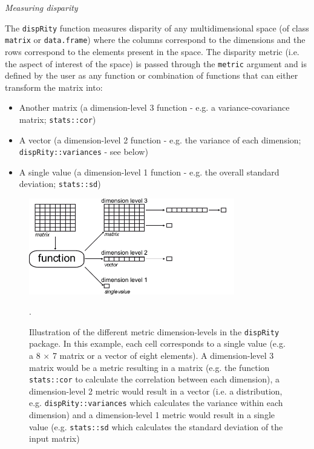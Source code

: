 \documentclass[12pt,letterpaper]{article}
\renewcommand{\subsection}[1]{%
\bigskip
\begin{center}
\begin{large}
\normalfont\itshape #1
\end{large}
\end{center}}
\newcommand{\disp}{\texttt{dispRity} }
\begin{document}
\subsection{Measuring disparity}
The \disp function measures disparity of any multidimensional space (of class \texttt{matrix} or \texttt{data.frame}) where the columns correspond to the dimensions and the rows correspond to the elements present in the space.
The disparity metric (i.e. the aspect of interest of the space) is passed through the \texttt{metric} argument and is defined by the user as any function or combination of functions that can either transform the matrix into:

\begin{itemize}
    \item Another matrix (a dimension-level 3 function - e.g. a variance-covariance matrix; \texttt{stats::cor})
    \item A vector (a dimension-level 2 function - e.g. the variance of each dimension; \texttt{dispRity::variances} - see below)
    \item A single value (a dimension-level 1 function - e.g. the overall standard deviation; \texttt{stats::sd})
\end{itemize}

\begin{figure}[!htbp]
\centering
   \includegraphics[width=0.8\textwidth]{../inst/gitbook/dispRity_fun.pdf} 
\caption{Illustration of the different metric dimension-levels in the \disp package. In this example, each cell corresponds to a single value (e.g. a 8 $\times$ 7 matrix or a vector of eight elements).
A dimension-level 3 matrix would be a metric resulting in a matrix (e.g. the function \texttt{stats::cor} to calculate the correlation between each dimension), a dimension-level 2 metric would result in a vector (i.e. a distribution, e.g. \texttt{dispRity::variances} which calculates the variance within each dimension) and a dimension-level 1 metric would result in a single value (e.g. \texttt{stats::sd} which calculates the standard deviation of the input matrix)}.
\label{Fig:levels}
\end{figure}
\end{document}
